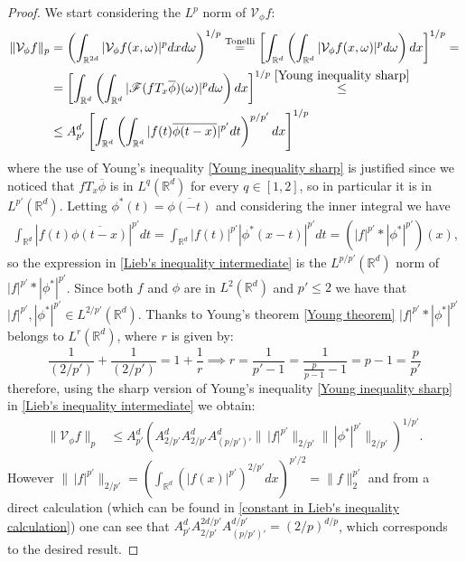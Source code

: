 \documentclass[corpo=11pt, stile=classica, tipotesi=custom,
greek, evenboxes, english]{toptesi}
\numberwithin{equation}{chapter}
\theoremstyle{remark}
\newcommand{\R}{\mathbb{R}} %
\newcommand{\V}{\mathcal{V}} %
\newcommand{\F}{\mathscr{F}} %
\begin{document}
\begin{proof}
	We start considering the $L^p$ norm of $\V_{\phi} f$:
	\begin{align}
		\|\V_{\phi} f\|_p &= \left(\int_{\R^{2d}} |\V_{\phi}f(x,\omega)|^p dxd\omega\right)^{1/p} \overset{\mathrm{Tonelli}}{=} \left[\int_{\R^d} \left(\int_{\R^d} |\V_{\phi} f (x,\omega)|^p d\omega\right)dx\right]^{1/p} =\nonumber \\
						  &= \left[\int_{\R^d} \left(\int_{\R^d} |\F(f T_x \overline{\phi})(\omega)|^p d\omega\right)dx\right]^{1/p} \overset{\eqref{Young inequality sharp}}{\leq} \nonumber\\
						  &\leq A_{p'}^d\left[\int_{\R^d} \left(\int_{\R^d} |f(t) \overline{\phi(t-x)}|^{p'}dt\right)^{p/p'}dx\right]^{1/p} \label{Lieb's inequality intermediate}
	\end{align}
	where the use of Young's inequality \eqref{Young inequality sharp} is justified since we noticed that $fT_x \overline{\phi}$ is in $L^q(\R^d)$ for every $q \in [1,2]$, so in particular it is in $L^{p'}(\R^d)$. Letting $\phi^*(t) = \overline{\phi(-t)}$ and considering the inner integral we have
	\begin{align*}
		\int_{\R^d} |f(t) \overline{\phi(t-x)}|^{p'}dt = \int_{\R^d} |f(t)|^{p'} |\phi^*(x-t)|^{p'}dt = \left(|f|^{p'} * |\phi^*|^{p'}\right)(x),
	\end{align*}
	so the expression in \eqref{Lieb's inequality intermediate} is the $L^{p/p'}(\R^d)$ norm of $|f|^{p'} * |\phi^*|^{p'}$. Since both $f$ and $\phi$ are in $L^2(\R^d)$ and $p' \leq 2$ we have that $|f|^{p'},|\phi^*|^{p'} \in L^{2/p'}(\R^d)$. Thanks to Young's theorem \ref{Young theorem} $|f|^{p'} * |\phi^*|^{p'}$ belongs to $L^r(\R^d)$, where $r$ is given by:
	\begin{equation*}
		\dfrac{1}{(2/p')} + \dfrac{1}{(2/p')} = 1 + \dfrac{1}{r} \implies r = \dfrac{1}{p'-1} = \dfrac{1}{\frac{p}{p-1}-1} = p-1 = \dfrac{p}{p'}
	\end{equation*}
	therefore, using the sharp version of Young's inequality \eqref{Young inequality sharp} in \eqref{Lieb's inequality intermediate} we obtain:
	\begin{align*}
		\|\V_{\phi} f\|_p &\leq A_{p'}^d \left(A_{2/p'}^d A_{2/p'}^d A_{(p/p')'}^d \| \,|f|^{p'} \|_{2/p'} \|\,|\phi^*|^{p'}\|_{2/p'} \right)^{1/p'}.
	\end{align*}
	However $\| \,|f|^{p'} \|_{2/p'} = (\int_{\R^d} (|f(x)|^{p'})^{2/p'}dx)^{p'/2} = \|f\|_2^{p'}$ and from a direct calculation (which can be found in \ref{constant in Lieb's inequality calculation}) one can see that $A_{p'}^d A_{2/p'}^{2d/p'}A_{(p/p')'}^{d/p'}=(2/p)^{d/p}$, which corresponds to the desired result.
\end{proof}
\end{document}
